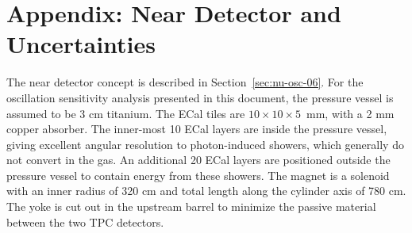 \section{Appendix: Near Detector and Uncertainties}\label{sec:nu-osc-12}\label{sec:physics-lbnosc-ND-app}

The near detector concept is described in Section~\ref{sec:nu-osc-06}. For the oscillation sensitivity analysis presented in this document, the pressure vessel is assumed to be 3 cm titanium. The ECal tiles are $10 \times 10 \times 5$~mm, with a 2 mm copper absorber. The inner-most 10 ECal layers are inside the pressure vessel, giving excellent angular resolution to photon-induced showers, which generally do not convert in the gas. An additional 20 ECal layers are positioned outside the pressure vessel to contain energy from these showers. The magnet is a solenoid with an inner radius of 320 cm and total length along the cylinder axis of 780 cm. The yoke is cut out in the upstream barrel to minimize the passive material between the two TPC detectors.

